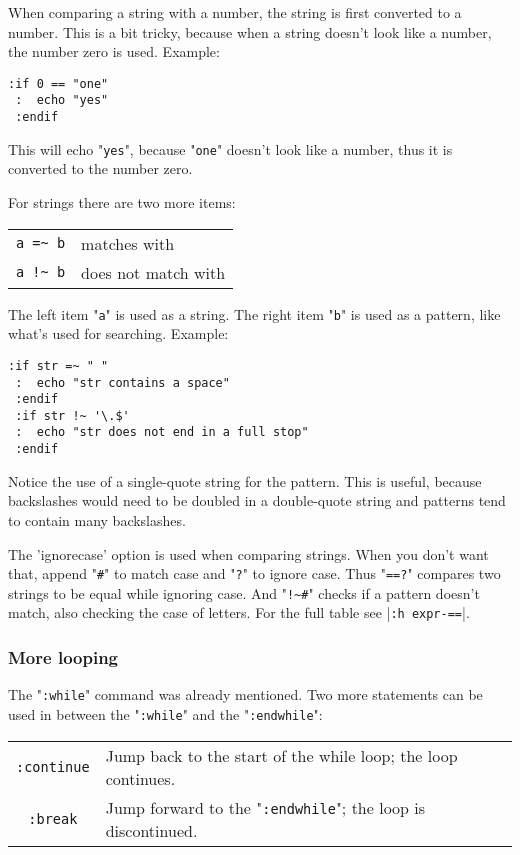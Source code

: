 When comparing a string with a number, the string is first converted to a number.
This is a bit tricky, because when a string doesn't look like a number, the number zero is used.
Example:

\begin{Verbatim}[samepage=true]
 :if 0 == "one"
 :  echo "yes"
 :endif
\end{Verbatim}

This will echo "\verb!yes!", because "\verb!one!" doesn't look like a number, thus it is converted to the number zero.

For strings there are two more items:
\begin{center} \begin{tabular}{c l}
				\verb;a =~ b; & matches with \\
				\verb;a !~ b; & does not match with \\
\end{tabular} \end{center}

The left item "\verb!a!" is used as a string.
The right item "\verb!b!" is used as a pattern, like what's used for searching.
Example:

\begin{Verbatim}[samepage=true]
 :if str =~ " "
 :  echo "str contains a space"
 :endif
 :if str !~ '\.$'
 :  echo "str does not end in a full stop"
 :endif
\end{Verbatim}

Notice the use of a single-quote string for the pattern.
This is useful, because backslashes would need to be doubled in a double-quote string and patterns tend to contain many backslashes.

The 'ignorecase' option is used when comparing strings.
When you don't want that, append "\verb!#!" to match case and "\verb!?!" to ignore case.
Thus "\verb!==?!" compares two strings to be equal while ignoring case.
And "\verb:!~#:" checks if a pattern doesn't match, also checking the case of letters.
For the full table see |\verb!:h expr-==!|.
\subsubsection{More looping}
The "\verb!:while!" command was already mentioned.
Two more statements can be used in between the "\verb!:while!" and the "\verb!:endwhile!":

\begin{center} \begin{tabular}{c l}
				\verb!:continue! & Jump back to the start of the while loop; the loop continues. \\
				\verb!:break! & Jump forward to the "\verb!:endwhile!"; the loop is discontinued. \\
\end{tabular} \end{center}

